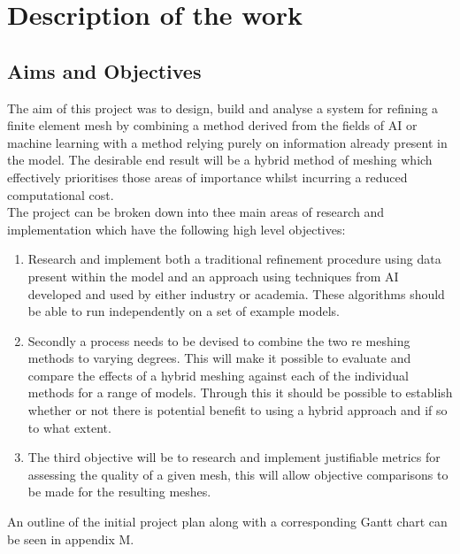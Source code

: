 
\section{Description of the work}
\subsection{Aims and Objectives}
The aim of this project was to design, build and analyse a system for refining a finite element mesh by combining a method derived from the fields of AI or machine learning with a method relying purely on information already present in the model. The desirable end result will be a hybrid method of meshing which effectively prioritises those areas of importance whilst incurring a reduced computational cost.\\

\noindent
The project can be broken down into thee main areas of research and implementation which have the following high level objectives:\\ 

\begin{enumerate}[label=\Alph*]

\item Research and implement both a traditional refinement procedure using data present within the model and an approach using techniques from AI developed and used by either industry or academia. These algorithms should be able to run independently on a set of example models.

\item Secondly a process needs to be devised to combine the two re meshing methods to varying degrees. This will make it possible to evaluate and compare the effects of a hybrid meshing against each of the individual methods for a range of models. Through this it should be possible to establish whether or not there is potential benefit to using a hybrid approach and if so to what extent.

\item The third objective will be to research and implement justifiable metrics for assessing the quality of a given mesh, this will allow objective comparisons to be made for the resulting meshes.


\end{enumerate}

\noindent
An outline of the initial project plan along with a corresponding Gantt chart can be seen in appendix M. \\

